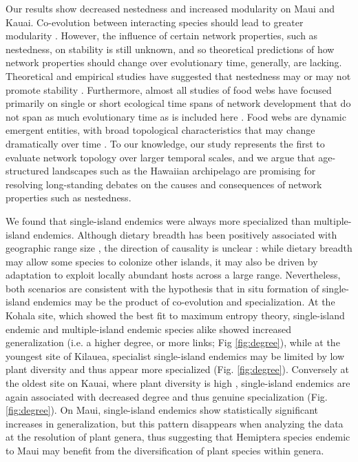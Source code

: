 Our results show decreased nestedness and increased modularity on Maui
and Kauai. Co-evolution between interacting species should lead to
greater modularity \citep{donatti2011, nuismer2013}. However, the
influence of certain network properties, such as nestedness, on
stability is still unknown, and so theoretical predictions of how
network properties should change over evolutionary time, generally,
are lacking. Theoretical and empirical studies have suggested that
nestedness may or may not promote stability \citep{allesina2012,
suweis2014}. Furthermore, almost all studies of food webs have focused
primarily on single or short ecological time spans of network
development that do not span as much evolutionary time as is included
here \citep[e.g.][]{albrecht2010}. Food webs are dynamic emergent
entities, with broad topological characteristics that may change
dramatically over time \citep[e.g.][]{yeakel2013}. To our knowledge,
our study represents the first to evaluate network topology over
larger temporal scales, and we argue that age-structured landscapes
such as the Hawaiian archipelago are promising for resolving
long-standing debates on the causes and consequences of network
properties such as nestedness.

We found that single-island endemics were always more specialized than
multiple-island endemics. Although dietary breadth has been positively
associated with geographic range size \citep{lewinsohn2005}, the
direction of causality is unclear \citep{slatyer2013}: while dietary
breadth may allow some species to colonize other islands, it may also
be driven by adaptation to exploit locally abundant hosts across a
large range. Nevertheless, both scenarios are consistent with the
hypothesis that in situ formation of single-island endemics may be the
product of co-evolution and specialization. At the Kohala site, which
showed the best fit to maximum entropy theory, single-island endemic
and multiple-island endemic species alike showed increased
generalization (i.e. a higher degree, or more links; Fig
\ref{fig:degree}), while at the youngest site of Kilauea, specialist
single-island endemics may be limited by low plant diversity and thus
appear more specialized (Fig. \ref{fig:degree}). Conversely at the oldest
site on Kauai, where plant diversity is high \citep{kitayama1995},
single-island endemics are again associated with decreased degree and
thus genuine specialization (Fig. \ref{fig:degree}). On Maui,
single-island endemics show statistically significant increases in
generalization, but this pattern disappears when analyzing the data at
the resolution of plant genera, thus suggesting that Hemiptera species
endemic to Maui may benefit from the diversification of plant species
within genera.


